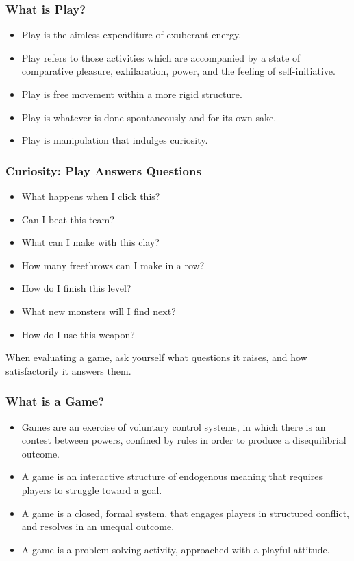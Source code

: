 \documentclass{beamer}
\begin{document}
\begin{frame}
  \frametitle{What is Play?}

\begin{itemize}
  \item Play is the aimless expenditure of exuberant energy.\pause
\item Play refers to those activities which are accompanied by a state
  of comparative pleasure, exhilaration, power, and the feeling of
  self-initiative.\pause
\item Play is free movement within a more rigid structure.\pause
\item Play is whatever is done spontaneously and for its own sake.\pause
\item Play is manipulation that indulges curiosity.
\end{itemize}

\end{frame}

\begin{frame}
  \frametitle{Curiosity:  Play Answers Questions}

\begin{itemize}
  \item What happens when I click this?
\item Can I beat this team?
\item What can I make with this clay?
\item How many freethrows can I make in a row?
\item How do I finish this level?
\item What new monsters will I find next?
\item How do I use this weapon?
\end{itemize}

When evaluating a game, ask yourself what questions it raises, and how
satisfactorily it answers them.

\end{frame}

\begin{frame}
  \frametitle{What is a Game?}

\begin{itemize}
  \item Games are an exercise of voluntary control systems, in which
    there is an contest between powers, confined by rules in order to
    produce a disequilibrial outcome.\pause
\item A game is an interactive structure of endogenous meaning that
  requires players to struggle toward a goal.\pause
\item A game is a closed, formal system, that engages players in
  structured conflict, and resolves in an unequal outcome.\pause
\item A game is a problem-solving activity, approached with a playful
  attitude. 
\end{itemize}

\end{frame}
\end{document}
